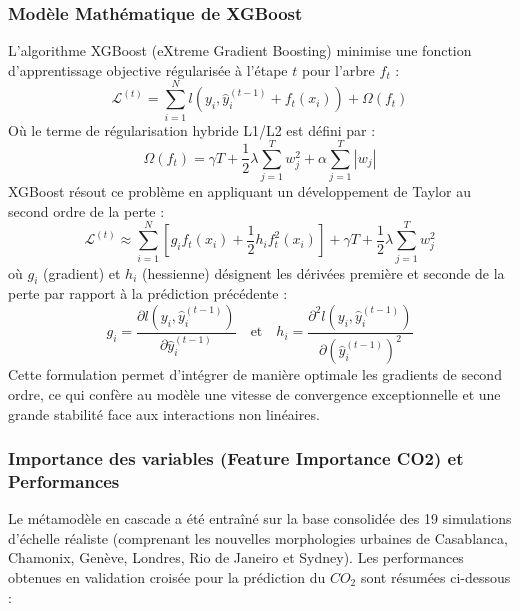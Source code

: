 \documentclass[10pt, a4paper]{article}
\begin{document}
\subsubsection{Modèle Mathématique de
XGBoost}\label{moduxe8le-mathuxe9matique-de-xgboost}

L'algorithme XGBoost (eXtreme Gradient Boosting) minimise une fonction
d'apprentissage objective régularisée à l'étape \(t\) pour l'arbre
\(f_t\) :
\[\mathcal{L}^{(t)} = \sum_{i=1}^N l\left(y_i, \hat{y}_i^{(t-1)} + f_t(x_i)\right) + \Omega(f_t)\]
Où le terme de régularisation hybride L1/L2 est défini par :
\[\Omega(f_t) = \gamma T + \frac{1}{2} \lambda \sum_{j=1}^T w_j^2 + \alpha \sum_{j=1}^T |w_j|\]
XGBoost résout ce problème en appliquant un développement de Taylor au
second ordre de la perte :
\[\mathcal{L}^{(t)} \approx \sum_{i=1}^N \left[ g_i f_t(x_i) + \frac{1}{2} h_i f_t^2(x_i) \right] + \gamma T + \frac{1}{2} \lambda \sum_{j=1}^T w_j^2\]
où \(g_i\) (gradient) et \(h_i\) (hessienne) désignent les dérivées
première et seconde de la perte par rapport à la prédiction précédente :
\[g_i = \frac{\partial l\left(y_i, \hat{y}_i^{(t-1)}\right)}{\partial \hat{y}_i^{(t-1)}} \quad \text{et} \quad h_i = \frac{\partial^2 l\left(y_i, \hat{y}_i^{(t-1)}\right)}{\partial \left(\hat{y}_i^{(t-1)}\right)^2}\]
Cette formulation permet d'intégrer de manière optimale les gradients de
second ordre, ce qui confère au modèle une vitesse de convergence
exceptionnelle et une grande stabilité face aux interactions non
linéaires.

\subsubsection{Importance des variables (Feature Importance CO2) et
Performances}\label{importance-des-variables-feature-importance-co2-et-performances}

Le métamodèle en cascade a été entraîné sur la base consolidée des 19
simulations d'échelle réaliste (comprenant les nouvelles morphologies
urbaines de Casablanca, Chamonix, Genève, Londres, Rio de Janeiro et
Sydney). Les performances obtenues en validation croisée pour la
prédiction du \(CO_2\) sont résumées ci-dessous :
\end{document}
